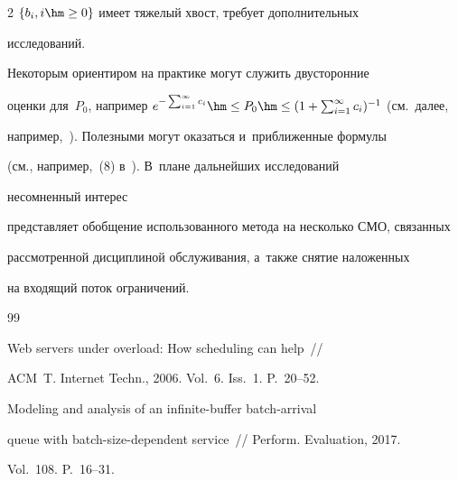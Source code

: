 \begin{multicols}{2}
$\{b_i, i \hm\ge 0\}$ имеет тяжелый хвост, требует дополнительных 


исследований.


Некоторым ориентиром на практике могут служить двусторонние


оценки для~$P_0$, например $e^{-\sum\nolimits_{i=1}^\infty c_i} \hm\le 


P_0 \hm\le 


(1+\sum\nolimits_{i=1}^\infty c_i)^{-1}$ (см.\ далее, 


например,~\cite{klam}). Полезными могут оказаться и~приближенные формулы 


(см., например,~(8) в~\cite{i1}). В~плане дальнейших исследований 


несомненный интерес


представляет обобщение использованного метода на несколько СМО, связанных


рассмотренной дисциплиной обслуживания, а~также снятие наложенных


на входящий поток ограничений.





\vspace*{-6pt}








{\small\frenchspacing


 {%




 \begin{thebibliography}{99}









Web servers under overload: How scheduling can help~//


ACM~T. Internet Techn., 2006. Vol.~6. Iss.~1. P.~20--52.









Modeling and analysis of an infinite-buffer batch-arrival


queue with batch-size-dependent service~// Perform. Evaluation, 2017. 


Vol.~108. P.~16--31.






\end{thebibliography}}}
\end{multicols}
